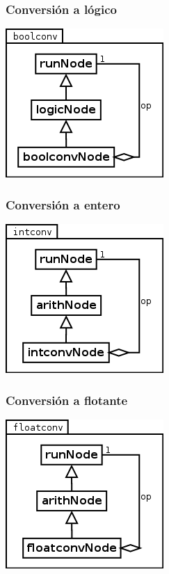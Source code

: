 \subsubsection {Conversión a lógico}
\begin{center}
\includegraphics[scale=0.4]{boolconv.png} \\
\end{center}

\subsubsection {Conversión a entero}
\begin{center}
\includegraphics[scale=0.4]{intconv.png} \\
\end{center}

\subsubsection {Conversión a flotante}
\begin{center}
\includegraphics[scale=0.4]{floatconv.png} \\
\end{center}

